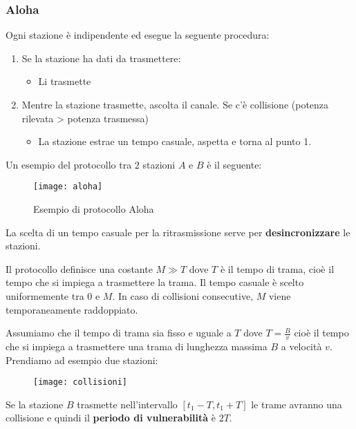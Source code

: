\documentclass[a4paper]{article}
\begin{document}
\subsubsection{Aloha}
Ogni stazione è indipendente ed esegue la seguente procedura:
\begin{enumerate}
  \item Se la stazione ha dati da trasmettere:
    \begin{itemize}
      \item Li trasmette
    \end{itemize}

  \item Mentre la stazione trasmette, ascolta il canale. 
    Se c'è collisione (potenza rilevata > potenza trasmessa)
    \begin{itemize}
      \item La stazione estrae un tempo casuale, aspetta e torna
        al punto 1.
    \end{itemize}
\end{enumerate}

\begin{example}
  Un esempio del protocollo tra 2 stazioni \( A \) e \( B \) è il seguente:
  \begin{figure}[H]
    \centering
    \texttt{[image: aloha]}
    \caption{Esempio di protocollo Aloha}
  \end{figure}
  \noindent
  La scelta di un tempo casuale per la ritrasmissione serve per \textbf{desincronizzare}
  le stazioni.

\end{example}
Il protocollo definisce una costante \( M \gg T \) dove \( T \) è il tempo di trama,
cioè il tempo che si impiega a trasmettere la trama. Il tempo casuale è scelto 
uniformemente tra 0 e \( M \). In caso di collisioni consecutive, \( M \) viene
temporaneamente raddoppiato.

\vspace{1em}
\noindent
Assumiamo che il tempo di trama sia fisso e uguale a \( T \) dove \( T = \frac{B}{v} \)
cioè il tempo che si impiega a trasmettere una trama di lunghezza massima \( B \) a velocità
\( v \).
Prendiamo ad esempio due stazioni:
\begin{figure}[H]
  \centering
  \texttt{[image: collisioni]}
\end{figure}
\noindent
Se la stazione \( B \) trasmette nell'intervallo \( [t_1 - T,t_1 + T] \) 
le trame avranno una collisione e quindi il \textbf{periodo di vulnerabilità} è \( 2T \).
\end{document}
